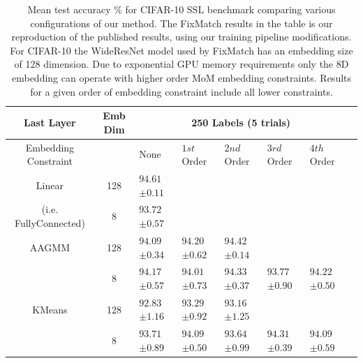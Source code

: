\documentclass[10pt,twocolumn,letterpaper]{article}
\begin{document}
\begin{table}[ht!]
\begin{tabularx}{\textwidth}{c|c|XXXXXX}
		\hline\hline
		Last Layer  &   Emb Dim  & \multicolumn{5}{c}{250 Labels (5 trials)}            \\ 
		\hline
		\multicolumn{1}{c|}{Embedding Constraint} &  & None & $1st$ Order & $2nd$ Order & $3rd$ Order & $4th$ Order  \\ 
		\hline
		Linear & 128  & $94.61$ \scriptsize{$\pm 0.11$}   &  &  &  &   \\
		(i.e. FullyConnected) & 8  & $93.72$ \scriptsize{$\pm 0.57$}      &  &  &  &   \\
		\hline
		AAGMM & 128  & $94.09$ \scriptsize{$\pm 0.34$}    & $94.20$ \scriptsize{$\pm 0.62$} & $94.42$ \scriptsize{$\pm 0.14$} &  &  \\
		& 8  & $94.17$ \scriptsize{$\pm 0.57$}    & $94.01$ \scriptsize{$\pm 0.73$} & $94.33$ \scriptsize{$\pm 0.37$} & $93.77$ \scriptsize{$\pm 0.90$} & $94.22$ \scriptsize{$\pm 0.50$} \\
		\hline
		KMeans & 128  & $92.83$ \scriptsize{$\pm 1.16$}    & $93.29$ \scriptsize{$\pm 0.92$} & $93.16$ \scriptsize{$\pm 1.25$} &  &  \\
		& 8  & $93.71$ \scriptsize{$\pm 0.89$}    & $94.09$ \scriptsize{$\pm 0.50$} & $93.64$ \scriptsize{$\pm 0.99$} & $94.31$ \scriptsize{$\pm 0.39$} & $94.09$ \scriptsize{$\pm 0.59$}  \\
	\end{tabularx}
	\caption{Mean test accuracy \% for CIFAR-10 SSL benchmark comparing various configurations of our method. The FixMatch results in the table is our reproduction of the published results, using our training pipeline modifications. For CIFAR-10 the WideResNet model used by FixMatch has an embedding size of 128 dimension. Due to exponential GPU memory requirements only the 8D embedding can operate with higher order MoM embedding constraints. Results for a given order of embedding constraint include all lower constraints.}
	\label{table1}
\end{table}
\end{document}
